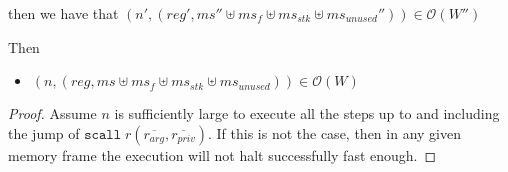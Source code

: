 \documentclass[a4paper]{article}
\newcommand{\var}[1]{\mathit{#1}}
\newcommand{\hs}{\var{ms}}
\newcommand{\ms}{\hs}
\newcommand{\reg}{\var{reg}}
\newcommand{\stk}{\var{stk}}
\newcommand{\observations}{\mathcal{O}}
\newcommand{\npair}[2][n]{\left(#1,#2 \right)}
\begin{document}
\begin{lemma}
\begin{itemize}
    then we have that $(n', (\reg',\ms'' \uplus \ms_f \uplus \ms_\stk \uplus \ms_{\var{unused}}'')) \in \observations(W'')$
  \end{itemize}
  Then 
  \begin{itemize}
    \item $\npair{(\reg,\ms \uplus \ms_f \uplus \ms_\stk \uplus \ms_{\var{unused}})} \in \observations(W)$
  \end{itemize}

\end{lemma}
\begin{proof}
  Assume $n$ is sufficiently large to execute all the steps up to and including the jump of $\mathtt{scall}\; r(\overline{r_{\var{arg}}},\overline{r_{\var{priv}}})$. If this is not the case, then in any given memory frame the execution will not halt successfully fast enough.


\end{proof}
\end{document}
